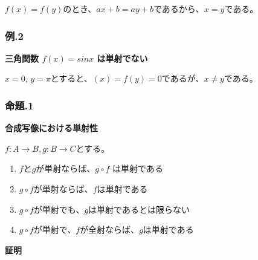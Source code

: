 \documentclass[dvipdfmx,autodetect-engine]{jsarticle}
\begin{document}
$f(x) = f(y)$のとき、$ax+b = ay+b$であるから、$x=y$である。

\subsubsection { 例.2 }
{\bf 三角関数 $f(x) = sinx$ は単射でない }

$x=0$, $y=\pi$とすると、$(x) = f(y) =0$であるが、$x \neq y$である。

\subsubsection{ 命題.1 }
\label{eq:injectiveProposition}

 {\bf 合成写像における単射性 }
 
 $f:A \to B, g: B \to C$とする。

\begin{enumerate}
	\item $f$と$g$が単射ならば、$g \circ f$ は単射である
	\item $g \circ f$が単射ならば、$f$は単射である
	\item $g \circ f$が単射でも、$g$は単射であるとは限らない
	\item $g \circ f$が単射で、$f$が全射ならば、$g$は単射である
\end{enumerate}

{\bf 証明}
\end{document}

